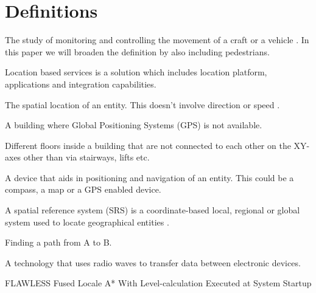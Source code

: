 \section{Definitions} %
\label{sec:definitions}

\begin{description}
	\item[Navigation] The study of monitoring and controlling the movement of a craft or a vehicle \cite{wiki_navi}. In this paper we will broaden the definition by also including pedestrians.

	\item[Location Based Services] Location based services is a solution which includes location platform, applications and integration capabilities.
	
	\item[Positioning] The spatial location of an entity. This doesn't involve direction or speed \cite{wiki_pos}.
	
	\item[Indoor] A building where Global Positioning Systems (GPS) is not available.
	
	\item[Building levels] Different floors inside a building that are not connected to each other on the XY-axes other than via stairways, lifts etc.
	
	\item[Navigational instrument] A device that aids in positioning and navigation of an entity. This could be a compass, a map or a GPS enabled device.
	
	
	\item[Spatial reference system] A spatial reference system (SRS) is a coordinate-based local, regional or global system used to locate geographical entities \cite{wiki_srs}.

	\item[Wayfinding]Finding a path from A to B.
	
	\item[Wi-FI] A technology that uses radio waves to transfer data between electronic devices.
	
	\item{FLAWLESS} Fused Locale A* With Level-calculation Executed at System Startup

\end{description}

